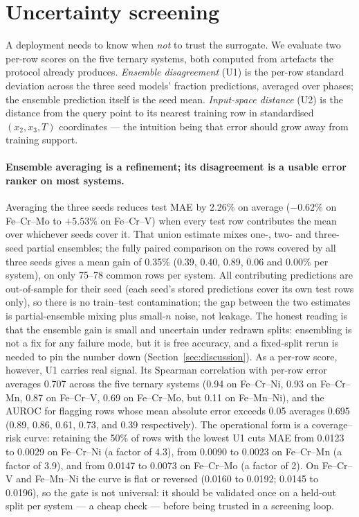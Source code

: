 \documentclass[preprint,12pt,authoryear]{elsarticle}
\begin{document}
\section{Uncertainty screening}
\label{sec:uncertainty}

A deployment needs to know when \emph{not} to trust the surrogate. We
evaluate two per-row scores on the five ternary systems, both computed
from artefacts the protocol already produces.
\emph{Ensemble disagreement} (U1) is the per-row standard deviation across
the three seed models' fraction predictions, averaged over phases; the
ensemble prediction itself is the seed mean. \emph{Input-space distance}
(U2) is the distance from the query point to its nearest training row in
standardised $(x_2, x_3, T)$ coordinates --- the intuition being that
error should grow away from training support.

\paragraph{Ensemble averaging is a refinement; its disagreement is a
usable error ranker on most systems.}
Averaging the three seeds reduces test MAE by 2.26\% on average
($-0.62\%$ on Fe--Cr--Mo to $+5.53\%$ on Fe--Cr--V) when every test row
contributes the mean over whichever seeds cover it. That union estimate
mixes one-, two- and three-seed partial ensembles; the fully paired
comparison on the rows covered by all three seeds gives a mean gain of
0.35\% (0.39, 0.40, 0.89, 0.06 and 0.00\% per system), on only 75--78
common rows per system. All contributing predictions are out-of-sample for
their seed (each seed's stored predictions cover its own test rows only),
so there is no train--test contamination; the gap between the two estimates
is partial-ensemble mixing plus small-$n$ noise, not leakage. The honest
reading is that the ensemble gain is small and uncertain under redrawn
splits: ensembling is not a fix for any failure mode, but it is free
accuracy, and a fixed-split rerun is needed to pin the number down
(Section~\ref{sec:discussion}). As a per-row score,
however, U1 carries real signal. Its Spearman correlation with per-row
error averages 0.707 across the five ternary systems (0.94 on Fe--Cr--Ni, 0.93 on
Fe--Cr--Mn, 0.87 on Fe--Cr--V, 0.69 on Fe--Cr--Mo, but 0.11 on
Fe--Mn--Ni), and the AUROC for flagging rows whose mean absolute error
exceeds 0.05 averages 0.695 (0.89, 0.86, 0.61, 0.73, and 0.39
respectively). The operational form is a coverage--risk curve: retaining
the 50\% of rows with the lowest U1 cuts MAE from 0.0123 to 0.0029 on
Fe--Cr--Ni (a factor of 4.3), from 0.0090 to 0.0023 on Fe--Cr--Mn
(a factor of 3.9), and from 0.0147 to 0.0073 on Fe--Cr--Mo (a factor of 2). On
Fe--Cr--V and Fe--Mn--Ni the curve is flat or reversed (0.0160 to
0.0192; 0.0145 to 0.0196), so the gate is not universal: it should be
validated once on a held-out split per system --- a cheap check ---
before being trusted in a screening loop.
\end{document}
